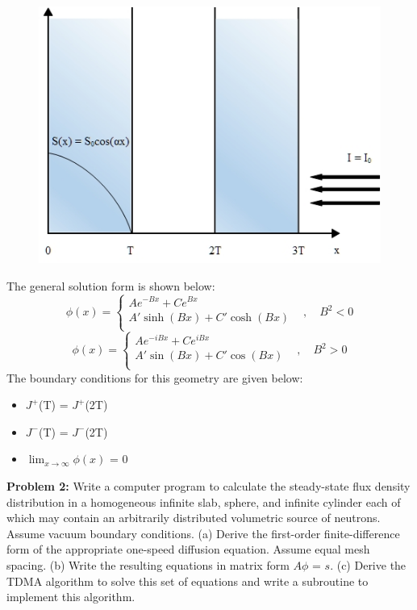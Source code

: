 \documentclass{amsart}
\theoremstyle{definition}
\begin{document}
\begin{figure}[h!]
                \includegraphics[width=.45\linewidth]{P1d.jpg}
\end{figure}
\bigbreak
The general solution form is shown below:
\bigbreak
\[   \phi(x) = \left\{
\begin{array}{ll}
      Ae^{-Bx} + Ce^{Bx} &  \\
      A'\sinh(Bx) + C'\cosh(Bx) &  \\
\end{array}
\right. , \quad B^2 < 0\]
\bigbreak
\[   \phi(x) = \left\{
\begin{array}{ll}
      Ae^{-iBx} + Ce^{iBx} &  \\
      A'\sin(Bx) + C'\cos(Bx) &  \\
\end{array}
\right. , \quad B^2 > 0\]
\bigbreak
The boundary conditions for this geometry are given below:
\begin{itemize}
    \item $J^+$(T) = $J^+$(2T)
    \item $J^-$(T) = $J^-$(2T)
    \item $\lim_{x \to \infty} \phi(x)$ = 0
\end{itemize}
\bigbreak
\newpage
\textbf{Problem 2:} Write a computer program to calculate the steady-state flux density distribution in a homogeneous infinite slab, sphere, and infinite cylinder each of which may contain an arbitrarily distributed volumetric source of neutrons. Assume vacuum boundary conditions.
\bigbreak
(a) Derive the first-order finite-difference form of the appropriate one-speed diffusion equation. Assume equal mesh spacing.\newline
\bigbreak
(b) Write the resulting equations in matrix form \textbf{$A\phi$} = \textbf{$s$}.\newline
\bigbreak
(c) Derive the TDMA algorithm to solve this set of equations and write a subroutine to implement this algorithm.\newline
\end{document}
